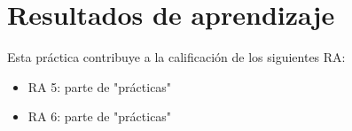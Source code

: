\documentclass[a4paper]{article}
\begin{document}
\section*{Resultados de aprendizaje}
\label{sec:org0000012}
Esta práctica contribuye a la calificación de los siguientes RA:
\begin{itemize}
\item RA 5: parte de "prácticas"
\item RA 6: parte de "prácticas"
\end{itemize}
\end{document}

